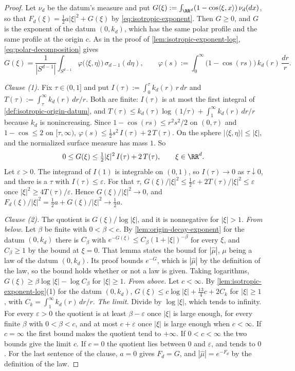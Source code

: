 \begin{proof}
\leanok
Let $\nu_d$ be the datum's \Levy{} measure and put
$G(\xi) := \int_{\RR^d}(1 - \cos\langle\xi,x\rangle)\,\nu_d(dx)$, so that
$F_d(\xi) = \tfrac12 a|\xi|^2 + G(\xi)$ by \ref{eq:isotropic-exponent}. Then $G \ge 0$, and $G$ is the
exponent of the datum $(0,k_d)$, which has the same polar profile and the same profile at the origin
$c$. As in the proof of \ref{lem:isotropic-exponent-log}, \ref{eq:polar-decomposition} gives
\[
  G(\xi) = \frac{1}{|S^{d-1}|}\int_{S^{d-1}}\varphi\bigl(\langle\xi,\eta\rangle\bigr)\,\sigma_{d-1}(d\eta),
  \qquad
  \varphi(s) := \int_0^\infty\bigl(1 - \cos(rs)\bigr)\,k_d(r)\,\frac{dr}{r} .
\]

\emph{Clause (1).} Fix $\tau \in (0,1]$ and put $I(\tau) := \int_0^\tau k_d(r)\,r\,dr$ and
$T(\tau) := \int_\tau^\infty k_d(r)\,dr/r$. Both are finite: $I(\tau)$ is at most the first integral
of \ref{def:isotropic-origin-datum}, and
$T(\tau) \le k_d(\tau)\log(1/\tau) + \int_1^\infty k_d(r)\,dr/r$ because $k_d$ is nonincreasing.
Since $1 - \cos(rs) \le r^2s^2/2$ on $(0,\tau)$ and $1 - \cos \le 2$ on $[\tau,\infty)$,
$\varphi(s) \le \tfrac12 s^2\,I(\tau) + 2\,T(\tau)$. On the sphere
$|\langle\xi,\eta\rangle| \le |\xi|$, and the normalized surface measure has mass $1$. So
\[
  0 \le G(\xi) \le \tfrac12|\xi|^2\,I(\tau) + 2\,T(\tau), \qquad \xi \in \RR^d .
\]
Let $\varepsilon > 0$. The integrand of $I(1)$ is integrable on $(0,1)$, so $I(\tau) \to 0$ as
$\tau \downarrow 0$, and there is a $\tau$ with $I(\tau) \le \varepsilon$. For that $\tau$,
$G(\xi)/|\xi|^2 \le \tfrac12\varepsilon + 2T(\tau)/|\xi|^2 \le \varepsilon$ once
$|\xi|^2 \ge 4T(\tau)/\varepsilon$. Hence $G(\xi)/|\xi|^2 \to 0$, and
$F_d(\xi)/|\xi|^2 = \tfrac12 a + G(\xi)/|\xi|^2 \to \tfrac12 a$.

\emph{Clause (2).} The quotient is $G(\xi)/\log|\xi|$, and it is nonnegative for $|\xi| > 1$.
\emph{From below.} Let $\beta$ be finite with $0 < \beta < c$. By \ref{lem:origin-decay-exponent}
for the datum $(0,k_d)$ there is $C_\beta$ with $e^{-G(\xi)} \le C_\beta(1+|\xi|)^{-\beta}$ for
every $\xi$, and $C_\beta \ge 1$ by the bound at $\xi = 0$. That lemma states the bound for
$|\widehat\mu|$, $\mu$ being a law of the datum $(0,k_d)$. Its proof bounds $e^{-G}$, which is
$|\widehat\mu|$ by the definition of the law, so the bound holds whether or not a law is given.
Taking logarithms, $G(\xi) \ge \beta\log|\xi| - \log C_\beta$ for $|\xi| \ge 1$. \emph{From above.}
Let $c < \infty$. By \ref{lem:isotropic-exponent-log}(1) for the datum $(0,k_d)$,
$G(\xi) \le c\log|\xi| + \tfrac{13}{4}c + 2C_k$ for $|\xi| \ge 1$, with
$C_k = \int_1^\infty k_d(r)\,dr/r$. \emph{The limit.} Divide by $\log|\xi|$, which tends to
infinity. For every $\varepsilon > 0$ the quotient is at least $\beta - \varepsilon$ once $|\xi|$ is
large enough, for every finite $\beta$ with $0 < \beta < c$, and at most $c + \varepsilon$ once
$|\xi|$ is large enough when $c < \infty$. If $c = \infty$ the first bound makes the quotient tend to
$+\infty$. If $0 < c < \infty$ the two bounds give the limit $c$. If $c = 0$ the quotient lies
between $0$ and $\varepsilon$, and tends to $0$. For the last sentence of the clause, $a = 0$ gives
$F_d = G$, and $|\widehat\mu| = e^{-F_d}$ by the definition of the law.


\end{proof}
